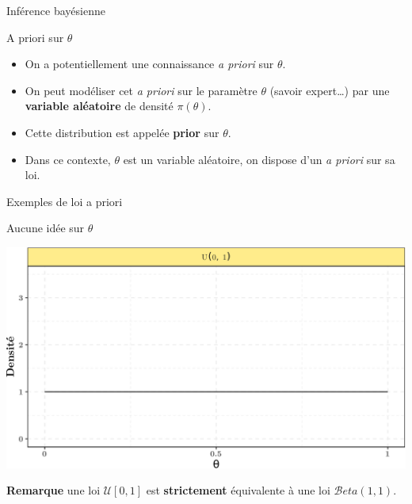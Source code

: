 \documentclass[9pt,ignorenonframetext,]{beamer}
\providecommand{\tightlist}{%
  \setlength{\itemsep}{0pt}\setlength{\parskip}{0pt}}
\begin{document}
\begin{frame}{Inférence bayésienne}
\protect\hypertarget{infuxe9rence-bayuxe9sienne}{}

\begin{block}{A priori sur \(\theta\)}

\begin{itemize}
\tightlist
\item
  On a potentiellement une connaissance \emph{a priori} sur \(\theta\).
  \pause
\item
  On peut modéliser cet \emph{a priori} sur le paramètre \(\theta\)
  (savoir expert\ldots{}) par une \textbf{variable aléatoire} de densité
  \(\pi(\theta)\). \pause 
\item
  Cette distribution est appelée \textbf{prior} sur \(\theta\).\pause
\item
  Dans ce contexte, \(\theta\) est un variable aléatoire, on dispose
  d'un \emph{a priori} sur sa loi.
\end{itemize}

\end{block}

\end{frame}

\begin{frame}{Exemples de loi a priori}
\protect\hypertarget{exemples-de-loi-a-priori}{}

Aucune idée sur \(\theta\)

\begin{center}\includegraphics{diapos_inference_bayesienne_files/figure-beamer/plot_prior_unif-1} \end{center}

\textbf{Remarque} une loi \(\mathcal{U}[0, 1]\) est \textbf{strictement}
équivalente à une loi \(\mathcal{B}eta(1, 1)\).

\end{frame}
\end{document}
